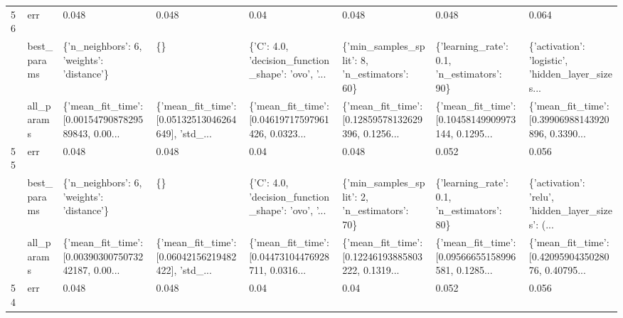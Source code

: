 \begin{tabular}{llllllll}
56 & err &                                              0.048 &                                              0.048 &                                               0.04 &                                              0.048 &                                              0.048 &                                              0.064 \\
   & best\_params &          \{'n\_neighbors': 6, 'weights': 'distance'\} &                                                 \{\} &  \{'C': 4.0, 'decision\_function\_shape': 'ovo', '... &       \{'min\_samples\_split': 8, 'n\_estimators': 60\} &         \{'learning\_rate': 0.1, 'n\_estimators': 90\} &  \{'activation': 'logistic', 'hidden\_layer\_sizes... \\
   & all\_params &  \{'mean\_fit\_time': [0.0015479087829589843, 0.00... &  \{'mean\_fit\_time': [0.05132513046264649], 'std\_... &  \{'mean\_fit\_time': [0.04619717597961426, 0.0323... &  \{'mean\_fit\_time': [0.12859578132629396, 0.1256... &  \{'mean\_fit\_time': [0.10458149909973144, 0.1295... &  \{'mean\_fit\_time': [0.39906988143920896, 0.3390... \\
55 & err &                                              0.048 &                                              0.048 &                                               0.04 &                                              0.048 &                                              0.052 &                                              0.056 \\
   & best\_params &          \{'n\_neighbors': 6, 'weights': 'distance'\} &                                                 \{\} &  \{'C': 4.0, 'decision\_function\_shape': 'ovo', '... &       \{'min\_samples\_split': 2, 'n\_estimators': 70\} &         \{'learning\_rate': 0.1, 'n\_estimators': 80\} &  \{'activation': 'relu', 'hidden\_layer\_sizes': (... \\
   & all\_params &  \{'mean\_fit\_time': [0.0039030075073242187, 0.00... &  \{'mean\_fit\_time': [0.06042156219482422], 'std\_... &  \{'mean\_fit\_time': [0.04473104476928711, 0.0316... &  \{'mean\_fit\_time': [0.12246193885803222, 0.1319... &  \{'mean\_fit\_time': [0.09566655158996581, 0.1285... &  \{'mean\_fit\_time': [0.4209590435028076, 0.40795... \\
54 & err &                                              0.048 &                                              0.048 &                                               0.04 &                                               0.04 &                                              0.052 &                                              0.056 \\

\end{tabular}
